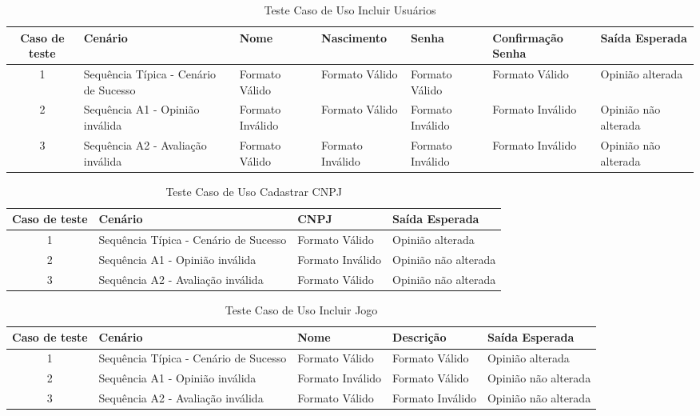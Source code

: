 \documentclass[a4paper,11pt]{article}
\begin{document}
	\begin{center}
	\begin{table}[H]
		\begin{tabularx}{\textwidth}{c|X|X|X|X|X|X}
			\textbf{Caso de teste} & \textbf{Cenário} & \textbf{Nome} & \textbf{Nascimento} & \textbf{Senha} & \textbf{Confirmação Senha} & \textbf{Saída Esperada} \\
			\hline
			1 & Sequência Típica - Cenário de Sucesso & Formato Válido & Formato Válido & Formato Válido & Formato Válido & Opinião alterada\\ \hline
			2 & Sequência A1 - Opinião inválida & Formato Inválido & Formato Válido & Formato Inválido & Formato Inválido & Opinião não alterada\\ \hline
			3 & Sequência A2 - Avaliação inválida & Formato Válido & Formato Inválido & Formato Inválido & Formato Inválido & Opinião não alterada\\ \hline
			
		\end{tabularx}
		\caption{Teste Caso de Uso Incluir Usuários}
	\end{table}
	\end{center}
	
	\begin{center}
	\begin{table}[H]
		\begin{tabularx}{\textwidth}{c|X|X|X}
			\textbf{Caso de teste} & \textbf{Cenário} & \textbf{CNPJ} & \textbf{Saída Esperada} \\
			\hline
			1 & Sequência Típica - Cenário de Sucesso & Formato Válido & Opinião alterada\\ \hline
			2 & Sequência A1 - Opinião inválida & Formato Inválido & Opinião não alterada\\ \hline
			3 & Sequência A2 - Avaliação inválida & Formato Válido & Opinião não alterada\\ \hline
			
		\end{tabularx}
		\caption{Teste Caso de Uso Cadastrar CNPJ}
	\end{table}
	\end{center}
	
	\begin{center}
	\begin{table}[H]
		\begin{tabularx}{\textwidth}{c|X|X|X|X}
			\textbf{Caso de teste} & \textbf{Cenário} & \textbf{Nome} & \textbf{Descrição} & \textbf{Saída Esperada} \\
			\hline
			1 & Sequência Típica - Cenário de Sucesso & Formato Válido & Formato Válido & Opinião alterada\\ \hline
			2 & Sequência A1 - Opinião inválida & Formato Inválido & Formato Válido & Opinião não alterada\\ \hline
			3 & Sequência A2 - Avaliação inválida & Formato Válido & Formato Inválido & Opinião não alterada\\ \hline
			
		\end{tabularx}
		\caption{Teste Caso de Uso Incluir Jogo}
	\end{table}
	\end{center}
	
\end{document}
